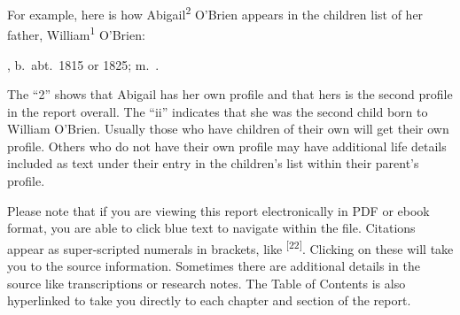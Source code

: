 For example, here is how Abigail\textsuperscript{2} O'Brien appears in the children list of her father, William\textsuperscript{1} O'Brien:

\vspace{\baselineskip}
	\begin{Kids}
	, b.\ abt.\ 1815 or 1825; m.\ .
	\end{Kids}
\vspace{\baselineskip}

The ``2'' shows that Abigail has her own profile and that hers is the second profile in the report overall. The ``ii'' indicates that she was the second child born to William O'Brien. Usually those who have children of their own will get their own profile. Others who do not have their own profile may have additional life details included as text under their entry in the children's list within their parent's profile.

Please note that if you are viewing this report electronically in PDF or ebook format, you are able to click blue text to navigate within the file. Citations appear as super-scripted numerals in brackets, like \textsuperscript{[22]}. Clicking on these will take you to the source information. Sometimes there are additional details in the source like transcriptions or research notes. The Table of Contents is also hyperlinked to take you directly to each chapter and section of the report.
